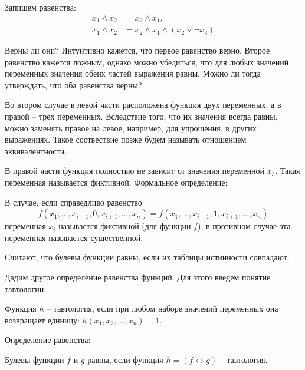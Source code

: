 Запишем равенства:
\begin{align*}
    x_1 \wedge x_2 &= x_2 \wedge x_1,\\
    x_1 \wedge x_2 &= x_2 \wedge x_1 \wedge (x_2 \vee \neg x_3)
\end{align*}

Верны ли они? Интуитивно кажется, что первое равенство верно. Второе равенство кажется ложным, однако можно убедиться, что для любых значений переменных значения обеих частей выражения равны.
Можно ли тогда утверждать, что оба равенства верны?

Во втором случае в левой части расположена функция двух переменных, а в правой -- трёх переменных. Вследствие того, что их значения всегда равны, можно заменять правое на левое, например, для упрощения, в других выражениях. Такое соотвествие позже будем называть отношением эквивалентности.

В правой части функция полностью не зависит от значения переменной $x_3$. Такая переменная называется фиктивной. Формальное определение:

В случае, если справедливо равенство 
\begin{equation*}
    f(x_1, \ldots, x_{i-1}, 0, x_{i+1}, \ldots, x_n) = 
    f(x_1, \ldots, x_{i-1}, 1, x_{i+1}, \ldots, x_n)
\end{equation*}
переменная $x_i$ называется фиктивной (для функции $f$); в противном случае эта переменная называется существенной.

Считают, что булевы функции равны, если их таблицы истинности совпадают.

Дадим другое определение равенства функций. Для этого введем понятие тавтологии.

Функция $h$ -- тавтология, если при любом наборе значений переменных она возвращает единицу: $h(x_1, x_2, \ldots, x_n) = 1$.

Определение равенства:

Булевы функции $f$ и $g$ равны, если функция $h=(f \leftrightarrow g)$ -- тавтология.
